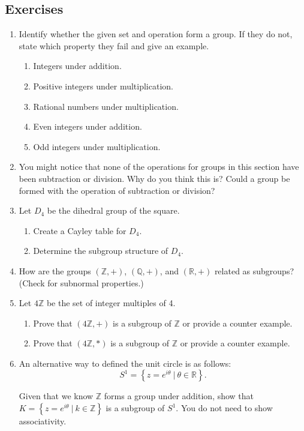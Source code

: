 \documentclass[
]{book}
\providecommand{\tightlist}{%
  \setlength{\itemsep}{0pt}\setlength{\parskip}{0pt}}
\theoremstyle{definition}
\theoremstyle{definition}
\theoremstyle{definition}
\theoremstyle{definition}
\theoremstyle{remark}
\begin{document}
\hypertarget{exercises-47}{%
\subsection{Exercises}\label{exercises-47}}

\begin{enumerate}
\def\labelenumi{\arabic{enumi}.}
\item
  Identify whether the given set and operation form a group. If they do not, state which property they fail and give an example.

  \begin{enumerate}
  \def\labelenumii{\alph{enumii}.}
  \tightlist
  \item
    Integers under addition.
  \item
    Positive integers under multiplication.
  \item
    Rational numbers under multiplication.
  \item
    Even integers under addition.
  \item
    Odd integers under multiplication.
  \end{enumerate}
\item
  You might notice that none of the operations for groups in this section have been subtraction or division. Why do you think this is? Could a group be formed with the operation of subtraction or division?
\item
  Let \(D_4\) be the dihedral group of the square.

  \begin{enumerate}
  \def\labelenumii{\alph{enumii}.}
  \tightlist
  \item
    Create a Cayley table for \(D_4\).
  \item
    Determine the subgroup structure of \(D_4\).
  \end{enumerate}
\item
  How are the groups \((\mathbb{Z},+)\), \((\mathbb{Q},+)\), and \((\mathbb{R},+)\) related as subgroups? (Check for subnormal properties.)
\item
  Let \(4\mathbb{Z}\) be the set of integer multiples of 4.

  \begin{enumerate}
  \def\labelenumii{\alph{enumii}.}
  \tightlist
  \item
    Prove that \((4\mathbb{Z},+)\) is a subgroup of \(\mathbb{Z}\) or provide a counter example.
  \item
    Prove that \((4\mathbb{Z},*)\) is a subgroup of \(\mathbb{Z}\) or provide a counter example.
  \end{enumerate}
\item
  An alternative way to defined the unit circle is as follows: \[S^1 = \left\{ z=e^{i\theta} \: \vert \: \theta \in \mathbb{R} \right\}.\]

  Given that we know \(\mathbb{Z}\) forms a group under addition, show that \(K = \left\{ z=e^{i\theta}\:\vert \: k \in \mathbb{Z} \right\}\) is a subgroup of \(S^1\). You do not need to show associativity.
\end{enumerate}
\end{document}
